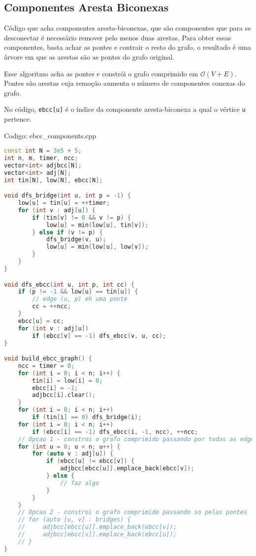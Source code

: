 \documentclass[10pt, a4paper, oneside]{book}
\begin{document}
\subsection{Componentes Aresta Biconexas}


Código que acha componentes aresta-biconexas, que são componentes que para se desconectar é necessário remover pelo menos duas arestas. Para obter essas componentes, basta achar as pontes e contrair o resto do grafo, o resultado é uma árvore em que as arestas são as pontes do grafo original.



Esse algoritmo acha as pontes e constrói o grafo comprimido em $\mathcal{O}(V + E)$. Pontes são arestas cuja remoção aumenta o número de componentes conexas do grafo.



No código, \texttt{ebcc[u]} é o índice da componente aresta-biconexa a qual o vértice \texttt{u} pertence.
\hfill

Codigo: ebcc\_components.cpp

\begin{lstlisting}[language=C++]
const int N = 3e5 + 5;
int n, m, timer, ncc;
vector<int> adjbcc[N];
vector<int> adj[N];
int tin[N], low[N], ebcc[N];

void dfs_bridge(int u, int p = -1) {
    low[u] = tin[u] = ++timer;
    for (int v : adj[u]) {
        if (tin[v] != 0 && v != p) {
            low[u] = min(low[u], tin[v]);
        } else if (v != p) {
            dfs_bridge(v, u);
            low[u] = min(low[u], low[v]);
        }
    }
}

void dfs_ebcc(int u, int p, int cc) {
    if (p != -1 && low[u] == tin[u]) {
        // edge (u, p) eh uma ponte
        cc = ++ncc;
    }
    ebcc[u] = cc;
    for (int v : adj[u])
        if (ebcc[v] == -1) dfs_ebcc(v, u, cc);
}

void build_ebcc_graph() {
    ncc = timer = 0;
    for (int i = 0; i < n; i++) {
        tin[i] = low[i] = 0;
        ebcc[i] = -1;
        adjbcc[i].clear();
    }
    for (int i = 0; i < n; i++)
        if (tin[i] == 0) dfs_bridge(i);
    for (int i = 0; i < n; i++)
        if (ebcc[i] == -1) dfs_ebcc(i, -1, ncc), ++ncc;
    // Opcao 1 - constroi o grafo comprimido passando por todas as edges
    for (int u = 0; u < n; u++) {
        for (auto v : adj[u]) {
            if (ebcc[u] != ebcc[v]) {
                adjbcc[ebcc[u]].emplace_back(ebcc[v]);
            } else {
                // faz algo
            }
        }
    }
    // Opcao 2 - constroi o grafo comprimido passando so pelas pontes
    // for (auto [u, v] : bridges) {
    //     adjbcc[ebcc[u]].emplace_back(ebcc[v]);
    //     adjbcc[ebcc[v]].emplace_back(ebcc[u]);
    // }
}\end{lstlisting}
\hfill
\end{document}
